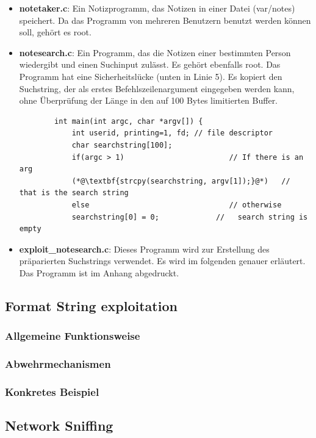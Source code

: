 \documentclass[11pt, a4paper]{article}
\begin{document}
\begin{itemize}
	\item \textbf{notetaker.c}: Ein Notizprogramm, das Notizen in einer Datei (var/notes) speichert. Da das Programm von mehreren Benutzern benutzt werden können soll, gehört es root.
	\item \textbf{notesearch.c}: Ein Programm, das die Notizen einer bestimmten Person wiedergibt und einen Suchinput zulässt. Es gehört ebenfalls root. Das Programm hat eine Sicherheitslücke (unten in Linie 5). Es kopiert den Suchstring, der als erstes Befehlszeilenargument eingegeben werden kann, ohne Überprüfung der Länge in den auf 100 Bytes limitierten Buffer.
	\begin{lstlisting}
		int main(int argc, char *argv[]) {
			int userid, printing=1, fd; // file descriptor
			char searchstring[100];
			if(argc > 1)                        // If there is an arg
			(*@\textbf{strcpy(searchstring, argv[1]);}@*)   //   that is the search string
			else                                // otherwise
			searchstring[0] = 0;             //   search string is empty
		\end{lstlisting}
	\item \textbf{exploit\_notesearch.c}: Dieses Programm wird zur Erstellung des präparierten Suchstrings verwendet. Es wird im folgenden genauer erläutert. Das Programm ist im Anhang abgedruckt.
\end{itemize}


\subsection{Format String exploitation}

\subsubsection{Allgemeine Funktionsweise}

\subsubsection{Abwehrmechanismen}

\subsubsection{Konkretes Beispiel}


\subsection{Network Sniffing}
\end{document}
